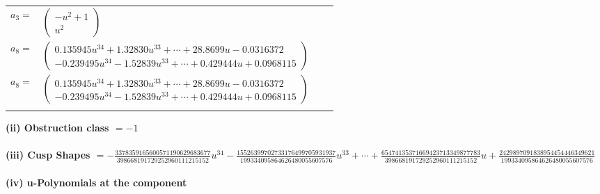 \documentclass[1p]{elsarticle_modified}
\theoremstyle{definition}
\begin{document}
\begin{tabular}{m{7pt} m{180pt} m{7pt} m{180pt} }
\flushright $a_{3}=$&$\begin{pmatrix}- u^2+1\\u^2\end{pmatrix}$ \\
\flushright $a_{8}=$&$\begin{pmatrix}0.135945 u^{34}+1.32830 u^{33}+\cdots+28.8699 u-0.0316372\\-0.239495 u^{34}-1.52839 u^{33}+\cdots+0.429444 u+0.0968115\end{pmatrix}$\\ \flushright $a_{8}=$&$\begin{pmatrix}0.135945 u^{34}+1.32830 u^{33}+\cdots+28.8699 u-0.0316372\\-0.239495 u^{34}-1.52839 u^{33}+\cdots+0.429444 u+0.0968115\end{pmatrix}$\\&\end{tabular}
\flushleft \textbf{(ii) Obstruction class $= -1$}\\~\\
\flushleft \textbf{(iii) Cusp Shapes $= -\frac{3378359165600571190629683677}{398668191729252960111215152} u^{34}-\frac{15526399702733176499705931937}{199334095864626480055607576} u^{33}+\cdots+\frac{65474135371669423713349877783}{398668191729252960111215152} u+\frac{2429897091838954454446349621}{199334095864626480055607576}$}\\~\\
\newpage\renewcommand{\arraystretch}{1}
\flushleft \textbf{(iv) u-Polynomials at the component}\newline \\
\end{document}
